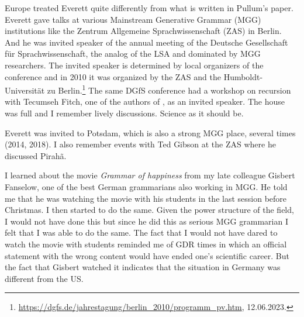 \documentclass[output=paper,colorlinks,citecolor=brown]{langscibook}
\begin{document}
Europe treated Everett quite differently from what is written in Pullum's paper. Everett gave talks at
various Mainstream Generative Grammar (MGG) institutions like the Zentrum Allgemeine
Sprachwissenschaft (ZAS) in Berlin. And he was invited
speaker of the annual meeting of the Deutsche Gesellschaft für Sprachwissenschaft, the analog of the
LSA and dominated by MGG researchers. The invited speaker is determined by local organizers of the
conference and in 2010 it was organized by the ZAS and the Humboldt-Universität zu Berlin.\footnote{
\url{https://dgfs.de/jahrestagung/berlin_2010/programm_pv.htm}, 12.06.2023.
}
The same DGfS conference had a workshop on recursion with Tecumseh Fitch, one of the authors of
, as an invited speaker. The house was full and I remember lively
discussions. Science as it should be.

Everett was invited to Potsdam, which is also a strong MGG place, several times (2014, 2018). I also
remember events with Ted Gibson at the ZAS where he discussed Pirahã.

I learned about the movie \emph{Grammar of happiness} from my late colleague Gisbert Fanselow, one of
the best German grammarians also working in MGG. He told me that he was watching the movie with his
students in the last session before Christmas. I then started to do the same. Given the power
structure of the field, I would not have done this but since he did this as serious MGG grammarian I
felt that I was able to do the same. The fact that I would not have dared to watch the movie with
students reminded me of GDR times in which an official statement with the wrong content would have
ended one's scientific career. But the fact that Gisbert watched it indicates that the situation in
Germany was different from the US.





\end{document}
